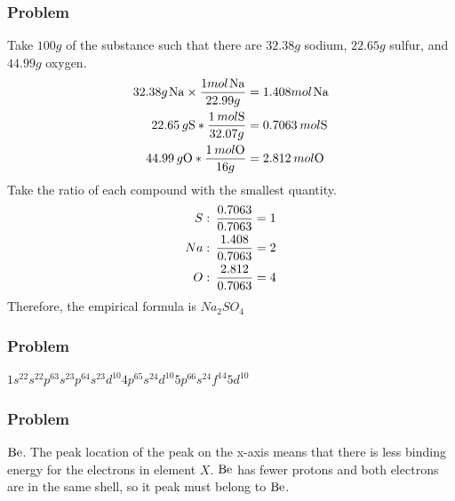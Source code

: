 \documentclass{article}
\begin{document}
\subsubsection*{Problem \countThis}
Take \(100g\) of the substance such that there are \(32.38g\) sodium, \(22.65g\) sulfur, and \(44.99g\) oxygen. 
\begin{equation}
\begin{aligned}
    32.38g\hspace{0.1em}\ce{Na} \times \frac{1mol\hspace{0.1em}\ce{Na}}{22.99g} &= 1.408mol\hspace{0.1em}\ce{Na} \\
    22.65\hspace{0.2em}g \ce{S} * \frac{1\hspace{0.2em}mol\ce{S}}{32.07g} &= 0.7063 \hspace{0.2em}mol\ce{S}\\
    44.99\hspace{0.2em}g\ce{O} * \frac{1\hspace{0.2em}mol\ce{O}}{16 g} &= 2.812\hspace{0.2em}mol \ce{O}
\end{aligned}
\end{equation}
Take the ratio of each compound with the smallest quantity. 
\begin{equation}
\begin{split}
    S:\hspace{0.2em}\frac{0.7063}{0.7063} = 1 \\
    Na:\hspace{0.2em}\frac{1.408}{0.7063} = 2 \\
    O:\hspace{0.2em}\frac{2.812}{0.7063} = 4
\end{split}
\end{equation}
Therefore, the empirical formula is \(Na_{2}SO_{4}\)
\subsubsection*{Problem \countThis}
\(1s^22s^22p^63s^23p^64s^23d^{10}4p^65s^24d^{10}5p^66s^24f^{14}5d^{10}\)
\subsubsection*{Problem \countThis}
\(\ce{Be}\). The peak location of the peak on the x-axis means that there is less binding energy for the electrons in element \(X\). \(\ce{Be}\) has fewer protons
and both electrons are in the same shell, so it peak must belong to \(\ce{Be}\).
\end{document}
